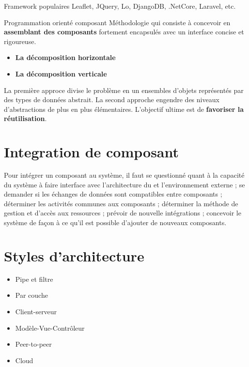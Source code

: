 \documentclass[16pt]{report}
\begin{document}
\begin{multicols*}{2}
        \begin{EExample}{Framework populaires}{}
            Leaflet, JQuery, Lo, DjangoDB, .NetCore, Laravel, etc. 
        \end{EExample}

        \begin{Definitionx}{Programmation orienté composant}{}
           Méthodologie qui consiste à concevoir en \textbf{assemblant des composants} fortement encapsulés 
           avec un interface concise et rigoureuse. 
           \begin{itemize}
            \item \textbf{La décomposition horizontale}  
            \item \textbf{La décomposition verticale}  
           \end{itemize}
           La première approce divise le problème en un ensembles d'objets représentés par des types 
           de données abstrait. La second approche engendre des niveaux d'abstractions de plus en plus 
           élémentaires. L'objectif ultime est de \textbf{favoriser la réutilisation}.  
        \end{Definitionx}

        \section{Integration de composant}
        Pour intégrer un composant au système, il faut se questionné quant à la capacité 
        du système à faire interface avec l'architecture du et l'environnement externe ; se demander 
        si les échanges de données sont compatibles entre composants ; déterminer les 
        \textcolor{myb}{activités communes} aux composants ; déterminer la méthode de gestion et d'accès 
        aux \textcolor{myb}{ressources} ; prévoir de \textcolor{myb}{nouvelle intégrations} ; concevoir 
        le système de façon à ce qu'il est possible d'ajouter de \textcolor{myb}{nouveaux composants}.

        \section{Styles d'architecture}
        \begin{itemize}
            \item Pipe et filtre 
            \item Par couche 
            \item Client-serveur 
            \item Modèle-Vue-Contrôleur 
            \item Peer-to-peer 
            \item Cloud
        \end{itemize}



\end{multicols*}
\end{document}
